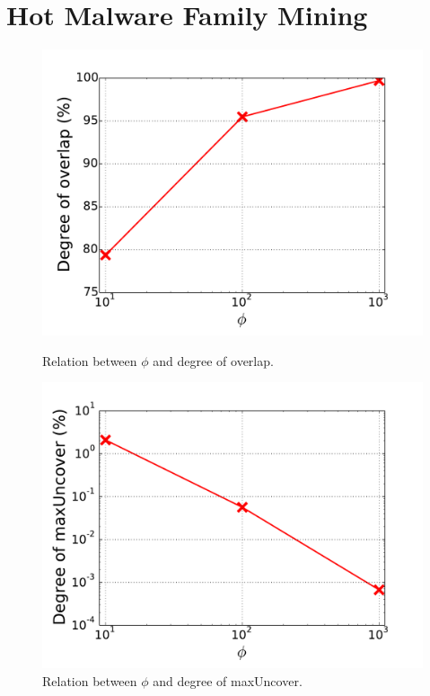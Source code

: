 \section{Hot Malware Family Mining}
\label{sec:hot}

\begin{figure}[!htb]
  \includegraphics[width=\linewidth]{figure/overlap.pdf}
  \caption{Relation between $\phi$ and degree of overlap.}
  \label{fig:overlap}
\endminipage\hfill
{}
  \includegraphics[width=\linewidth]{figure/maxUncover.pdf}
  \caption{Relation between $\phi$ and degree of maxUncover.}
  \label{fig:maxUncover}
\endminipage\hfill
{}%

\end{figure}
